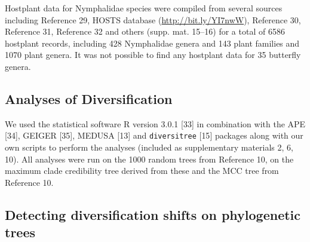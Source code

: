 \documentclass[10pt]{article}
\begin{document}
Hostplant data for Nymphalidae species were compiled from several
sources including Reference 29, HOSTS database
(\url{http://bit.ly/YI7nwW}), Reference 30, Reference 31, Reference 32
and others (supp. mat. 15--16) for a total of 6586 hostplant records,
including 428 Nymphalidae genera and 143 plant families and 1070 plant
genera. It was not possible to find any hostplant data for 35 butterfly
genera.

\subsection*{Analyses of Diversification}

We used the statistical software R version 3.0.1 {[}33{]} in combination
with the APE {[}34{]}, GEIGER {[}35{]}, MEDUSA {[}13{]} and
\texttt{diversitree} {[}15{]} packages along with our own scripts to
perform the analyses (included as supplementary materials 2, 6, 10). All
analyses were run on the 1000 random trees from Reference 10, on the
maximum clade credibility tree derived from these and the MCC tree from
Reference 10.

\subsection*{Detecting diversification shifts on phylogenetic trees}
\end{document}
